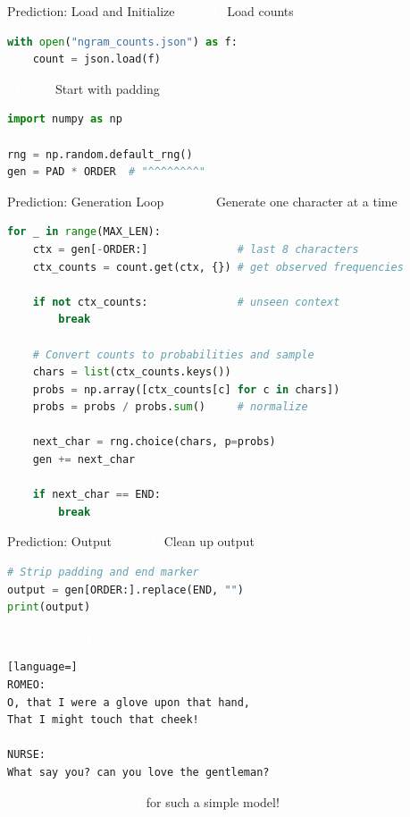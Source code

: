 \documentclass[aspectratio=169]{beamer}
\renewcommand{\textbf}[1]{\textcolor{white}{\bfseries #1}}
\begin{document}
\begin{frame}[fragile]{Prediction: Load and Initialize}
\textbf{Step 1:} Load counts

\begin{lstlisting}[language=Python]
with open("ngram_counts.json") as f:
    count = json.load(f)
\end{lstlisting}

\vspace{1em}
\textbf{Step 2:} Start with padding

\begin{lstlisting}[language=Python]
import numpy as np

rng = np.random.default_rng()
gen = PAD * ORDER  # "^^^^^^^^"
\end{lstlisting}
\end{frame}

\begin{frame}[fragile,shrink=10]{Prediction: Generation Loop}
\textbf{Step 3:} Generate one character at a time

\begin{lstlisting}[language=Python]
for _ in range(MAX_LEN):
    ctx = gen[-ORDER:]              # last 8 characters
    ctx_counts = count.get(ctx, {}) # get observed frequencies
    
    if not ctx_counts:              # unseen context
        break
    
    # Convert counts to probabilities and sample
    chars = list(ctx_counts.keys())
    probs = np.array([ctx_counts[c] for c in chars])
    probs = probs / probs.sum()     # normalize
    
    next_char = rng.choice(chars, p=probs)
    gen += next_char
    
    if next_char == END:
        break
\end{lstlisting}
\end{frame}


\begin{frame}[fragile]{Prediction: Output}
\textbf{Step 4:} Clean up output

\begin{lstlisting}[language=Python]
# Strip padding and end marker
output = gen[ORDER:].replace(END, "")
print(output)
\end{lstlisting}

\vspace{1em}
\textbf{Example outputs:}
\begin{lstlisting}[language=]
ROMEO:
O, that I were a glove upon that hand,
That I might touch that cheek!

NURSE:
What say you? can you love the gentleman?
\end{lstlisting}

\vspace{1em}
\textbf{Surprisingly coherent} for such a simple model!
\end{frame}
\end{document}
